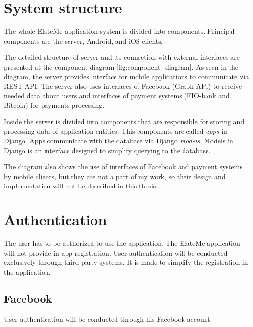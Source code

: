 


\section{System structure}
The whole ElateMe application system is divided into components. Principal components are the server, Android, and iOS clients.

The detailed structure of server and its connection with external interfaces are presented at the component diagram \ref{fig:component_diagram}. As seen in the diagram, the server provides interface for mobile applications to communicate via REST API. The server also uses interfaces of Facebook (Graph API) to receive needed data about users and interfaces of payment systems (FIO-bank and Bitcoin) for payments processing.

Inside the server is divided into components that are responsible for storing and processing data of application entities. This components are called \textit{apps} in Django. Apps communicate with the database via Django \textit{models}. Models in Django is an interface designed to simplify querying to the database.


The diagram also shows the use of interfaces of Facebook and payment systems by mobile clients, but they are not a part of my work, so their design and implementation will not be described in this thesis.



\section{Authentication}
The user has to be authorized to use the application. The ElateMe application will not provide in-app registration. User authentication will be conducted exclusively through third-party systems. It is made to simplify the registration in the application.


\subsection{Facebook}
User authentication will be conducted through his Facebook account.

